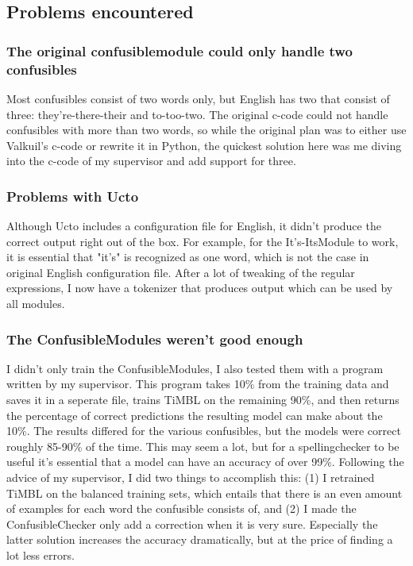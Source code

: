 \documentclass[12pt]{article}
\begin{document}
\subsection{Problems encountered}

\subsubsection{The original confusiblemodule could only handle two confusibles}
Most confusibles consist of two words only, but English has two that consist of three: they're-there-their and to-too-two. The original c-code could not handle confusibles with more than two words, so while the original plan was to either use Valkuil's c-code or rewrite it in Python, the quickest solution here was me diving into the c-code of my supervisor and add support for three.

\subsubsection{Problems with Ucto}
Although Ucto includes a configuration file for English, it didn't produce the correct output right out of the box. For example, for the It's-ItsModule to work, it is essential that "it's" is recognized as one word, which is not the case in original English configuration file. After a lot of tweaking of the regular expressions, I now have a tokenizer that produces output which can be used by all modules.

\subsubsection{The ConfusibleModules weren't good enough}
I didn't only train the ConfusibleModules, I also tested them with a program written by my supervisor. This program takes 10\% from the training data and saves it in a seperate file, trains TiMBL on the remaining 90\%, and then returns the percentage of correct predictions the resulting model can make about the 10\%. The results differed for the various confusibles, but the models were correct roughly 85-90\% of the time. This may seem a lot, but for a spellingchecker to be useful it's essential that a model can have an accuracy of over 99\%. Following the advice of my supervisor, I did two things to accomplish this: (1) I retrained TiMBL on the balanced training sets, which entails that there is an even amount of examples for each word the confusible consists of, and (2) I made the ConfusibleChecker only add a correction when it is very sure. Especially the latter solution increases the accuracy dramatically, but at the price of finding a lot less errors.
\end{document}
